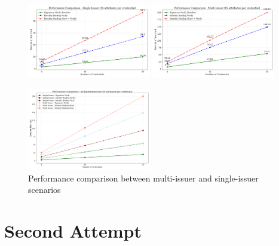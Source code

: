 \begin{figure}
    \centering
    \begin{minipage}{\textwidth}
        \centering
        \includegraphics[width=0.48\textwidth]{figures/identity_binding_single_issuer_performance.png}
        \hfill
        \includegraphics[width=0.48\textwidth]{figures/identity_binding_multi_issuer_performance.png}
    \end{minipage}
    
    \vspace{1em} %
    
    \begin{minipage}{\textwidth}
        \centering
        \includegraphics[width=0.48\textwidth]{figures/identity_binding_combined_performance.png}
    \end{minipage}
    
    \caption{Performance comparison between multi-issuer and single-issuer scenarios}
    \label{fig:performance-comparison}
\end{figure}

\clearpage
































\section{Second Attempt}

\newpage


